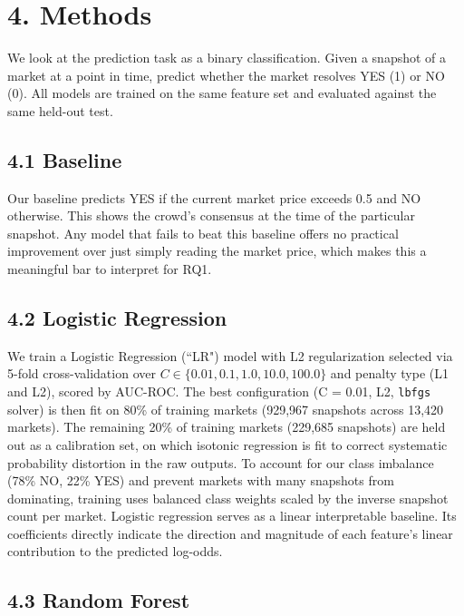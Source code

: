 \documentclass[11pt,twocolumn]{article}
\begin{document}
\section*{4. Methods}

We look at the prediction task as a binary classification. Given a snapshot of a market at a point in time, predict whether the market resolves YES (1) or NO (0). All models are trained on the same feature set and evaluated against the same held-out test.

\subsection*{4.1 Baseline}

Our baseline predicts YES if the current market price exceeds 0.5 and NO otherwise. This shows the crowd's consensus at the time of the particular snapshot. Any model that fails to beat this baseline offers no practical improvement over just simply reading the market price, which makes this a meaningful bar to interpret for RQ1.

\subsection*{4.2 Logistic Regression}

We train a Logistic Regression (``LR") model with L2 regularization selected via 5-fold cross-validation over $C \in \{0.01, 0.1, 1.0, 10.0, 100.0\}$ and penalty type (L1 and L2), scored by AUC-ROC. The best configuration (C = 0.01, L2, \texttt{lbfgs} solver) is then fit on 80\% of training markets (929,967 snapshots across 13,420 markets). The remaining 20\% of training markets (229,685 snapshots) are held out as a calibration set, on which isotonic regression is fit to correct systematic probability distortion in the raw outputs. To account for our class imbalance (78\% NO, 22\% YES) and prevent markets with many snapshots from dominating, training uses balanced class weights scaled by the inverse snapshot count per market. Logistic regression serves as a linear interpretable baseline. Its coefficients directly indicate the direction and magnitude of each feature's linear contribution to the predicted log-odds.

\subsection*{4.3 Random Forest}
\end{document}
